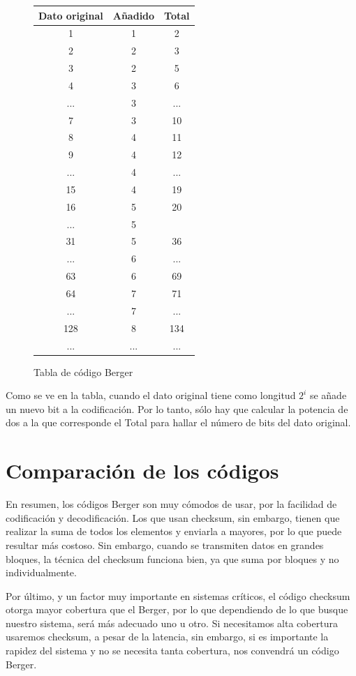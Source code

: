 \documentclass[a4paper]{article}
\begin{document}
	\begin{figure}[h!]
		\centering
		\begin{tabular}{| c | c | c |}
				\hline
				Dato original & Añadido & Total \\ \hline
				\rowcolor{LightCyan}
				1 & 1 & 2 \\ \hline
				\rowcolor{LightCyan}
				2 & 2 & 3 \\ \hline
				3 & 2 & 5 \\ \hline
				\rowcolor{LightCyan}
				4 & 3 & 6 \\ \hline
				... & 3 & ... \\ \hline
				7 & 3 & 10 \\ \hline
				\rowcolor{LightCyan}
				8 & 4 & 11 \\ \hline
				9 & 4 & 12 \\ \hline
				... & 4 & ... \\ \hline
				15 & 4 & 19 \\ \hline
				\rowcolor{LightCyan}
				16 & 5 & 20 \\ \hline
				... & 5 &  \\ \hline
				31 & 5 & 36 \\ \hline
				\rowcolor{LightCyan}
				... & 6 & ... \\ \hline
				63 & 6 & 69 \\ \hline
				\rowcolor{LightCyan}
				64 & 7 & 71 \\ \hline
				... & 7 & ... \\ \hline
				\rowcolor{LightCyan}
				128 & 8 & 134 \\ \hline
				... & ... & ... \\ 
				\hline
		\end{tabular}

		\label{t_berger}
		\caption{Tabla de código Berger}
	\end{figure}
	Como se ve en la tabla, cuando el dato original tiene como longitud $2^i$ se añade un nuevo bit a la codificación. Por lo tanto, sólo hay que calcular la potencia de dos a la que corresponde el Total para hallar el número de bits del dato original.

\section{Comparación de los códigos}
	En resumen, los códigos Berger son muy cómodos de usar, por la facilidad de codificación y decodificación. Los que usan checksum, sin embargo, tienen que realizar la suma de todos los elementos y enviarla a mayores, por lo que puede resultar más costoso. Sin embargo, cuando se transmiten datos en grandes bloques, la técnica del checksum funciona bien, ya que suma por bloques y no individualmente.

	Por último, y un factor muy importante en sistemas críticos, el código checksum otorga mayor cobertura que el Berger, por lo que dependiendo de lo que busque nuestro sistema, será más adecuado uno u otro. Si necesitamos alta cobertura usaremos checksum, a pesar de la latencia, sin embargo, si es importante la rapidez del sistema y no se necesita tanta cobertura, nos convendrá un código Berger.
\end{document}
